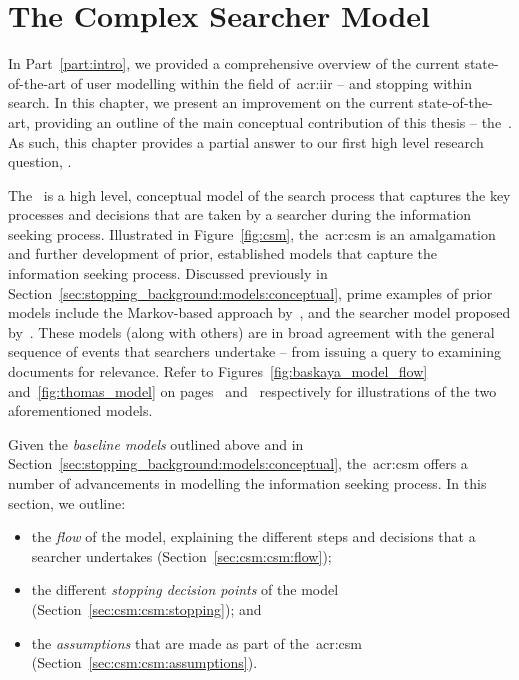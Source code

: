 
\chapter[The Complex Searcher Model]{The Complex Searcher Model}\label{chap:csm}
In Part~\ref{part:intro}, we provided a comprehensive overview of the current state-of-the-art of user modelling within the field of~\gls{acr:iir} -- and stopping within search. In this chapter, we present an improvement on the current state-of-the-art, providing an outline of the main conceptual contribution of this thesis -- the~. As such, this chapter provides a partial answer to our first high level research question, .

The~ is a high level, conceptual model of the search process that captures the key processes and decisions that are taken by a searcher during the information seeking process. Illustrated in Figure~\ref{fig:csm}, the~\gls{acr:csm} is an amalgamation and further development of prior, established models that capture the information seeking process. Discussed previously in Section~\ref{sec:stopping_background:models:conceptual}, prime examples of prior models include the Markov-based approach by~\cite{baskaya2013behavioural_factors}, and the searcher model proposed by~\cite{thomas2014modelling_behaviour}. These models (along with others) are in broad agreement with the general sequence of events that searchers undertake -- from issuing a query to examining documents for relevance. Refer to Figures~\ref{fig:baskaya_model_flow} and~\ref{fig:thomas_model} on pages~\pageref{fig:baskaya_model_flow} and~\pageref{fig:thomas_model} respectively for illustrations of the two aforementioned models.

Given the \emph{baseline models} outlined above and in Section~\ref{sec:stopping_background:models:conceptual}, the~\gls{acr:csm} offers a number of advancements in modelling the information seeking process. In this section, we outline:

\begin{itemize}
    \item{the \emph{flow} of the model, explaining the different steps and decisions that a searcher undertakes (Section~\ref{sec:csm:csm:flow});}
    \item{the different \emph{stopping decision points} of the model (Section~\ref{sec:csm:csm:stopping}); and}
    \item{the \emph{assumptions} that are made as part of the~\gls{acr:csm} (Section~\ref{sec:csm:csm:assumptions}).}
\end{itemize}

